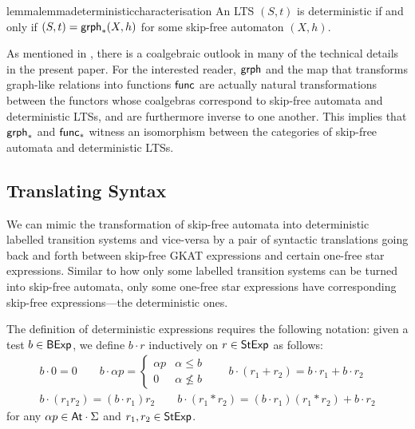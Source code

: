 \documentclass[orivec,envcountsect,envcountsame]{llncs}
\begin{document}
\begin{restatable}{lemma}{lemmadeterministiccharacterisation}
    An LTS \((S, t)\) is deterministic if and only if \((S, t) = \mathsf{grph}_*(X, h)\) for some skip-free automaton \((X, h)\).
\end{restatable}

\begin{remark}
    As mentioned in , there is a coalgebraic outlook in many of the technical details in the present paper.
    For the interested reader, \(\mathsf{grph}\) and the map that transforms graph-like relations into functions \(\mathsf{func}\) are actually natural transformations between the functors whose coalgebras correspond to skip-free automata and deterministic LTSs, and are furthermore inverse to one another.
    This implies that \(\mathsf{grph}_*\) and \(\mathsf{func}_*\) witness an isomorphism between the categories of skip-free automata and deterministic LTSs.
\end{remark}

\subsection{Translating Syntax}
We can mimic the transformation of skip-free automata into deterministic labelled transition systems and vice-versa by a pair of syntactic translations going back and forth between skip-free \textsf{GKAT} expressions and certain one-free star expressions. Similar to how only some labelled transition systems can be turned into skip-free automata, only some one-free star expressions have corresponding skip-free \GKAT expressions---the deterministic ones.

The definition of deterministic expressions requires the following notation: given a test \(b \in \mathsf{BExp}\), we define \(b\cdot r\) inductively on \(r \in \mathsf{StExp}\) as follows:
\begin{gather*}
    b\cdot 0 = 0
    \qquad
    b\cdot \alpha p =
    \begin{cases}
        \alpha p & \alpha \leq b\\
        0 & \alpha \not\leq b
    \end{cases}
    \qquad
    b\cdot (r_1 + r_2) = b\cdot r_1 + b\cdot r_2
    \\
    b \cdot (r_1r_2) = (b\cdot r_1)r_2
    \qquad
    b\cdot (r_1 * r_2) = (b\cdot r_1)(r_1*r_2) + b \cdot r_2
\end{gather*}
for any \(\alpha p \in \mathsf{At}\cdot \Sigma\) and \(r_1,r_2 \in \mathsf{StExp}\).
\end{document}
